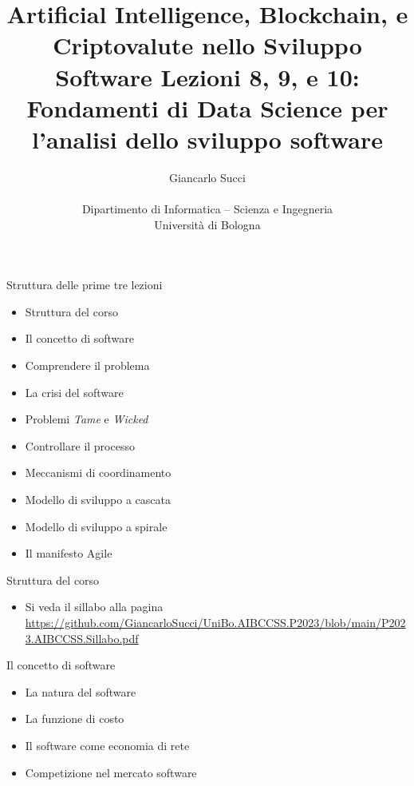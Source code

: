 \documentclass{beamer}
\title[L01]{Artificial Intelligence, Blockchain, e Criptovalute nello Sviluppo Software \newline\newline
Lezioni 8, 9, e 10: Fondamenti di Data Science per l'analisi dello sviluppo software} %
\author[{\tiny Giancarlo Succi }]{Giancarlo Succi\\\\ Dipartimento di Informatica -- Scienza e Ingegneria\\Universit\`{a} di Bologna\\
\bftt{g.succi@unibo.it}
} %
\institute[unibo] %
\date{} %
\begin{document}
\begin{frame}
\titlepage %

\end{frame}




\begin{frame}
{\centerline{Struttura delle prime tre lezioni}}
\begin{itemize}
    \item Struttura del corso
    \item Il concetto di software
    \item Comprendere il problema
    \item La crisi del software
    \item Problemi \textit{Tame} e \textit{Wicked}
    \item Controllare il processo
    \item Meccanismi di coordinamento
    \item Modello di sviluppo a cascata
    \item Modello di sviluppo a spirale
    \item Il manifesto Agile
\end{itemize} 
\end{frame}

\begin{frame}
{\centerline{Struttura del corso}}
\begin{itemize}
    \item Si veda il sillabo alla pagina \url{https://github.com/GiancarloSucci/UniBo.AIBCCSS.P2023/blob/main/P2023.AIBCCSS.Sillabo.pdf}
\end{itemize} 
\end{frame}


\begin{frame}
{\centerline{Il concetto di software}}
\begin{itemize}
    \item La natura del software
    \item La funzione di costo
    \item Il software come economia di rete 
    \item Competizione nel mercato software
\end{itemize} 
\end{frame}
\end{document}
